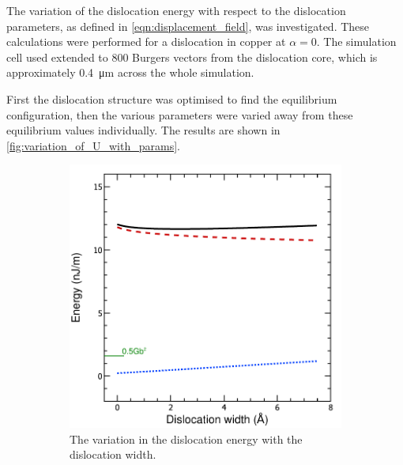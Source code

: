 The variation of the dislocation energy with respect to the dislocation parameters, as defined in \autoref{eqn:displacement_field}, was investigated. These calculations were performed for a dislocation in copper at $\alpha=0$. The simulation cell used extended to \num{800} Burgers vectors from the dislocation core, which is approximately \SI{0.4}{\micro\meter} across the whole simulation.

First the dislocation structure was optimised to find the equilibrium configuration, then the  various parameters were varied away from these equilibrium values individually. The results are shown in \autoref{fig:variation_of_U_with_params}. 


\begin{figure}
\centering
\begin{subfigure}{0.4\textwidth}
\centering
\includegraphics[width=\textwidth]{U_vs_w}
\caption{The variation in the dislocation energy with the dislocation width.\label{fig:U_vs_w}}
\end{subfigure}
~
\begin{subfigure}{0.4\textwidth}
\centering

\end{subfigure}
\end{figure}
